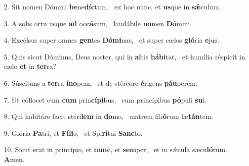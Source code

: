 2. Sit nomen Dómini \textbf{be}ne\textbf{díc}tum, \ast\  ex hoc nunc, et \textbf{us}que in \textbf{sǽ}culum.\

3. A solis ortu usque \textbf{ad} oc\textbf{cá}sum, \ast\  laudábile \textbf{no}men \textbf{Dó}mini.\

4. Excélsus super omnes \textbf{gen}tes \textbf{Dó}\textbf{mi}nus, \ast\  et super cælos \textbf{gló}ria \textbf{e}jus.\

5. Quis sicut Dóminus, Deus noster, qui in \textbf{al}tis \textbf{há}\textbf{bi}tat, \ast\  et humília réspicit in cælo \textbf{et} in \textbf{ter}ra?\

6. Súscitans a \textbf{ter}ra \textbf{ín}\textbf{o}pem, \ast\  et de stércore \textbf{é}rigens \textbf{páu}perem:\

7. Ut cóllocet eum \textbf{cum} prin\textbf{cí}\textbf{pi}bus, \ast\  cum princípibus \textbf{pó}puli \textbf{su}i.\

8. Qui habitáre facit stéri\textbf{lem} in \textbf{do}mo, \ast\  matrem fili\textbf{ó}rum læ\textbf{tán}tem.\

9. Glória \textbf{Pa}tri, et \textbf{Fí}\textbf{li}o, \ast\  et Spi\textbf{rí}tui \textbf{Sanc}to.\

10. Sicut erat in princípio, et \textbf{nunc}, et \textbf{sem}per, \ast\  et in sǽcula sæcu\textbf{ló}rum. \textbf{A}men.\

